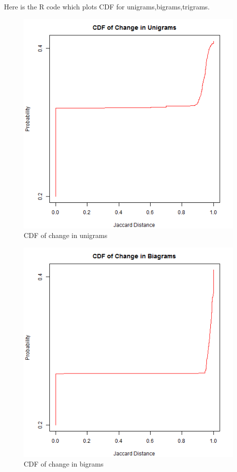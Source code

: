 Here is the R code which plots CDF for unigrams,bigrams,trigrams.


\begin{figure}[ht]
	\begin{center}
		 \includegraphics[scale=0.60]{Unigramq1}
		  \caption{CDF of change in unigrams}
	 \end{center}
\end{figure}
\begin{figure}[ht]
	\begin{center}
		 \includegraphics[scale=0.60]{bigramsq1}
		  \caption{CDF of change in bigrams}
	 \end{center}
\end{figure}
